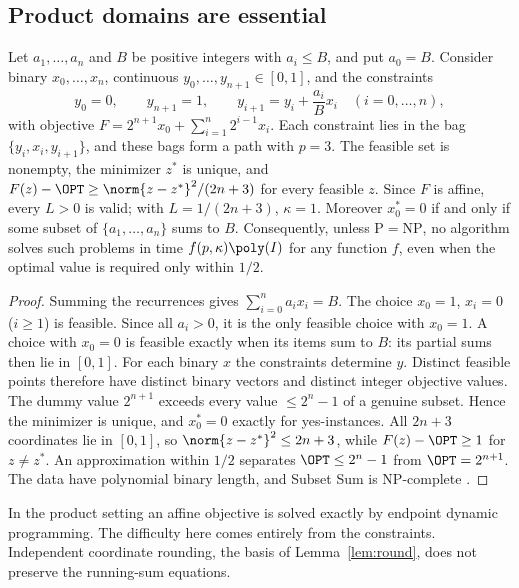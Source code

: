\subsection{Product domains are essential}\label{sec:limits-constraints}

\begin{proposition}\label{lim:prop:constraints}
Let $a_1,\ldots,a_n$ and $B$ be positive integers with $a_i\le B$, and put
$a_0=B$. Consider binary $x_0,\ldots,x_n$, continuous
$y_0,\ldots,y_{n+1}\in[0,1]$, and the constraints
\[
y_0=0,\qquad y_{n+1}=1,\qquad y_{i+1}=y_i+\frac{a_i}Bx_i\quad(i=0,\ldots,n),
\]
with objective $F=2^{n+1}x_0+\sum_{i=1}^n2^{i-1}x_i$. Each constraint lies in
the bag $\{y_i,x_i,y_{i+1}\}$, and these bags form a path with $p=3$. The
feasible set is nonempty, the minimizer $z^*$ is unique, and
$F(z)-\OPT\ge\norm{z-z^*}^2/(2n+3)$ for every feasible $z$. Since $F$ is
affine, every $L>0$ is valid; with $L=1/(2n+3)$, $\kappa=1$. Moreover
$x_0^*=0$ if and only if some subset of $\{a_1,\ldots,a_n\}$ sums to $B$.
Consequently, unless $\mathrm P=\mathrm{NP}$, no algorithm solves such
problems in time $f(p,\kappa)\poly(I)$ for any function $f$, even when the
optimal value is required only within $1/2$.
\end{proposition}

\begin{proof}
Summing the recurrences gives $\sum_{i=0}^na_ix_i=B$. The choice $x_0=1$,
$x_i=0$ ($i\ge1$) is feasible. Since all $a_i>0$, it is the only feasible
choice with $x_0=1$. A choice with $x_0=0$ is feasible exactly when its
items sum to $B$: its partial sums then lie in $[0,1]$. For each binary $x$
the constraints determine $y$. Distinct feasible points therefore have
distinct binary vectors and distinct integer objective values. The dummy
value $2^{n+1}$ exceeds every value $\le2^n-1$ of a genuine subset. Hence
the minimizer is unique, and $x_0^*=0$ exactly for yes-instances. All
$2n+3$ coordinates lie in $[0,1]$, so $\norm{z-z^*}^2\le2n+3$, while
$F(z)-\OPT\ge1$ for $z\ne z^*$. An approximation within $1/2$ separates
$\OPT\le2^n-1$ from $\OPT=2^{n+1}$. The data have polynomial binary length,
and Subset Sum is NP-complete \cite{GareyJohnson1979}.
\end{proof}

In the product setting an affine objective is solved exactly by endpoint
dynamic programming. The difficulty here comes entirely from the
constraints. Independent coordinate rounding, the basis of
Lemma~\ref{lem:round}, does not preserve the running-sum equations.

